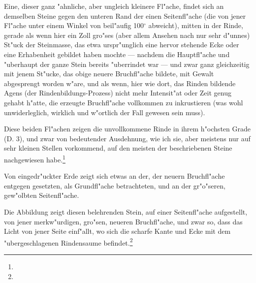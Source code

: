 \documentclass[a4paper, 11pt, oneside, german]{article}
\begin{document}
Eine, dieser ganz "ahnliche, aber ungleich kleinere Fl"ache, findet sich an demselben Steine gegen den unteren Rand der einen Seitenfl"ache (die von jener Fl"ache unter einem Winkel von beil"aufig 100$^{\circ}$ abweicht), mitten in der Rinde, gerade als wenn hier ein Zoll gro"ses (aber allem Ansehen nach nur sehr d"unnes) St"uck der Steinmasse, das etwa urspr"unglich eine hervor stehende Ecke oder eine Erhabenheit gebildet haben mochte --- nachdem die Hauptfl"ache und "uberhaupt der ganze Stein bereits "uberrindet war --- und zwar ganz gleichzeitig mit jenem St"ucke, das obige neuere Bruchfl"ache bildete, mit Gewalt abgesprengt worden w"are, und als wenn, hier wie dort, das Rinden bildende Agens (der Rindenbildungs-Prozess) nicht mehr Intensit"at oder Zeit genug gehabt h"atte, die erzeugte Bruchfl"ache vollkommen zu inkrustieren (was wohl unwiderleglich, wirklich und w"ortlich der Fall gewesen sein muss).

Diese beiden Fl"achen zeigen die unvollkommene Rinde in ihrem h"ochsten Grade (D. 3), und zwar von bedeutender Ausdehnung, wie ich sie, aber meistens nur auf sehr kleinen Stellen vorkommend, auf den meisten der beschriebenen Steine nachgewiesen habe.\footnote{}

Von eingedr"uckter Erde zeigt sich etwas an der, der neuern Bruchfl"ache entgegen gesetzten, als Grundfl"ache betrachteten, und an der gr"o"seren, gew"olbten Seitenfl"ache.

Die Abbildung zeigt diesen belehrenden Stein, auf einer Seitenfl"ache aufgestellt, von jener merkw"urdigen, gro"sen, neueren Bruchfl"ache, und zwar so, dass das Licht von jener Seite einf"allt, wo sich die scharfe Kante und Ecke mit dem "ubergeschlagenen Rindensaume befindet.\footnote{}
\end{document}
